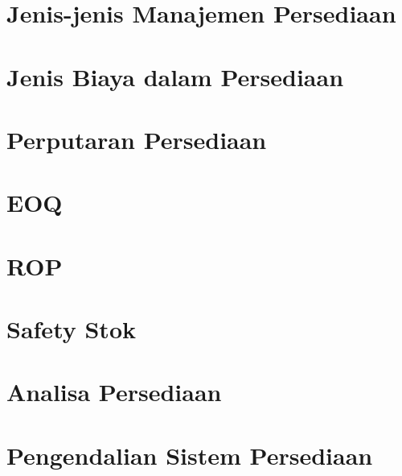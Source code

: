 \section{Jenis-jenis Manajemen Persediaan}



\section{Jenis Biaya dalam Persediaan}



\section{Perputaran Persediaan}
\section{EOQ}
\section{ROP}
\section{Safety Stok}
\section{Analisa Persediaan}
\section{Pengendalian Sistem Persediaan}

